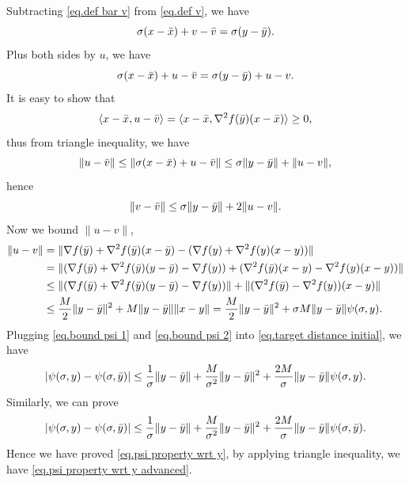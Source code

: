 \documentclass[moor,sglanonrev]{informs4}
\begin{document}
\begin{APPENDICES}
    Subtracting \eqref{eq.def bar v} from \eqref{eq.def v}, we have
    \begin{equation*}
        \sigma(x-\Bar{x})+v -\Bar{v} = \sigma(y-\Bar{y}).
    \end{equation*}
    Plus both sides by $u$, we have
    \begin{equation*}
        \sigma(x-\Bar{x})+u-\Bar{v} = \sigma(y-\Bar{y})+u-v.
    \end{equation*}
    It is easy to show that
    \begin{equation*}
        \langle x-\Bar{x},u-\Bar{v}\rangle = \langle x-\Bar{x},\nabla ^2 f(\Bar{y})(x-\Bar{x})\rangle\geq 0,
    \end{equation*}
    thus from triangle inequality, we have
    \begin{equation*}
        \|u-\Bar{v}\| \leq \|\sigma(x-\Bar{x})+u-\Bar{v}\| \leq \sigma \|y-\Bar{y}\|+\|u-v\|,
    \end{equation*}
    hence
    \begin{equation}\label{eq.bound psi 1}
        \|v-\Bar{v}\| \leq \sigma\|y-\Bar{y}\| +2\|u-v\|.
    \end{equation}
    Now we bound $\|u-v\|$,
    \begin{equation}\label{eq.bound psi 2}
        \begin{aligned}
            \|u-v\| & = \|\nabla f(\Bar{y})+\nabla ^2 f(\Bar{y})(x-\Bar{y})-(\nabla f(y) + \nabla ^2 f(y)(x-y))\|                              \\
                    & = \|(\nabla f(\Bar{y})+\nabla^2 f(\Bar{y})(y-\Bar{y})-\nabla f(y))+(\nabla^2 f(\Bar{y})(x-y)-\nabla^2 f(y)(x-y))\|       \\
                    & \leq \|(\nabla f(\Bar{y})+\nabla^2 f(\Bar{y})(y-\Bar{y})-\nabla f(y))\| +\|(\nabla^2 f(\Bar{y})-\nabla^2 f(y))(x-y)\|    \\
                    & \leq \frac{M}{2}\|y-\Bar{y}\|^2+M\|y-\Bar{y}\|\|x-y\|  =\frac{M}{2}\|y-\Bar{y}\|^2+\sigma M \|y-\Bar{y}\|\psi(\sigma,y).
        \end{aligned}
    \end{equation}
    Plugging \eqref{eq.bound psi 1} and \eqref{eq.bound psi 2} into \eqref{eq.target distance initial}, we have
    \begin{equation*}
        \left \vert \psi(\sigma,y)-\psi(\sigma,\Bar{y}) \right\vert \leq \frac{1}{\sigma}\|y-\Bar{y}\| +\frac{M}{\sigma^2}\|y-\Bar{y}\|^2 +\frac{2M}{\sigma}\|y-\Bar{y}\|\psi(\sigma,y).
    \end{equation*}
    Similarly, we can prove
    \begin{equation*}
        \left \vert \psi(\sigma,y)-\psi(\sigma,\Bar{y}) \right\vert \leq \frac{1}{\sigma}\|y-\Bar{y}\| +\frac{M}{\sigma^2}\|y-\Bar{y}\|^2 +\frac{2M}{\sigma}\|y-\Bar{y}\|\psi(\sigma,\Bar{y}).
    \end{equation*}
    Hence we have proved \eqref{eq.psi property wrt y}, by applying triangle inequality, we have \eqref{eq.psi property wrt y advanced}.
    \Halmos \endproof

\end{APPENDICES}
\end{document}
